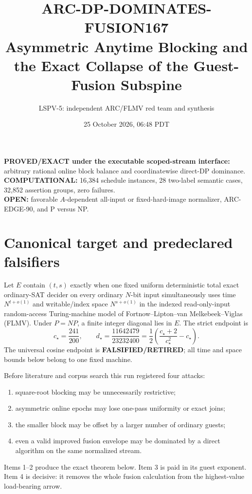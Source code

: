 \documentclass[11pt]{article}
\title{ARC-DP-DOMINATES-FUSION167\\
\large Asymmetric Anytime Blocking and the Exact Collapse of the Guest-Fusion Subspine}
\author{LSPV-5: independent ARC/FLMV red team and synthesis}
\date{25 October 2026, 06:48 PDT}
\begin{document}
\maketitle
\begin{center}
\textbf{PROVED/EXACT under the executable scoped-stream interface:}
arbitrary rational online block balance and coordinatewise direct-DP dominance.\\
\textbf{COMPUTATIONAL:} 16,384 schedule instances, 28 two-label semantic cases,
32,852 assertion groups, zero failures.\\
\textbf{OPEN:} favorable $A$-dependent all-input or fixed-hard-image normalizer,
ARC-EDGE-90, and P versus NP.
\end{center}

\section{Canonical target and predeclared falsifiers}
Let $E$ contain $(t,s)$ exactly when one fixed uniform deterministic total
exact ordinary-SAT decider on every ordinary $N$-bit input simultaneously
uses time $N^{t+o(1)}$ and writable/index space $N^{s+o(1)}$ in the indexed
read-only-input random-access Turing-machine model of
Fortnow--Lipton--van Melkebeek--Viglas (FLMV).  Under $P=NP$, a finite
integer diagonal lies in $E$.  The strict endpoint is
\[
 c_\star=\frac{241}{200},\qquad
 d_\star=\frac{11642479}{23232400}
 =\frac12\left(\frac{c_\star+2}{c_\star^2}-c_\star\right).
\]
The universal cosine endpoint is \textbf{FALSIFIED/RETIRED}; all time and
space bounds below belong to one fixed machine.

Before literature and corpus search this run registered four attacks:
\begin{enumerate}
\item square-root blocking may be unnecessarily restrictive;
\item asymmetric online epochs may lose one-pass uniformity or exact joins;
\item the smaller block may be offset by a larger number of ordinary guests;
\item even a valid improved fusion envelope may be dominated by a direct
algorithm on the same normalized stream.
\end{enumerate}
Items 1--2 produce the exact theorem below.  Item 3 is paid in its guest
exponent.  Item 4 is decisive: it removes the whole fusion calculation from
the highest-value load-bearing arrow.
\end{document}

